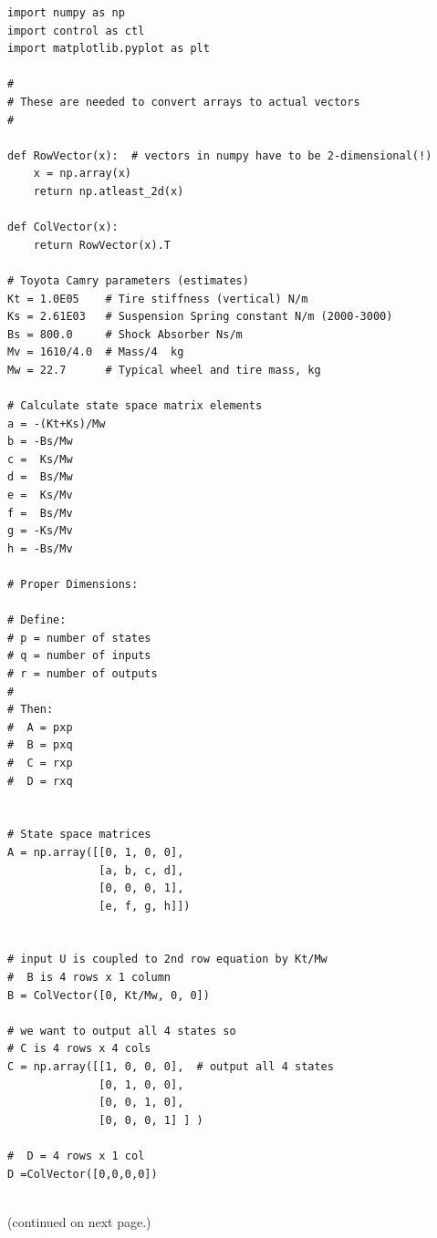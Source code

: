 \begin{listing}
\begin{verbatim}
import numpy as np
import control as ctl
import matplotlib.pyplot as plt

#
# These are needed to convert arrays to actual vectors
#

def RowVector(x):  # vectors in numpy have to be 2-dimensional(!)
    x = np.array(x)
    return np.atleast_2d(x)

def ColVector(x):
    return RowVector(x).T

# Toyota Camry parameters (estimates)
Kt = 1.0E05    # Tire stiffness (vertical) N/m
Ks = 2.61E03   # Suspension Spring constant N/m (2000-3000)
Bs = 800.0     # Shock Absorber Ns/m
Mv = 1610/4.0  # Mass/4  kg
Mw = 22.7      # Typical wheel and tire mass, kg

# Calculate state space matrix elements
a = -(Kt+Ks)/Mw
b = -Bs/Mw
c =  Ks/Mw
d =  Bs/Mw
e =  Ks/Mv
f =  Bs/Mv
g = -Ks/Mv
h = -Bs/Mv

# Proper Dimensions:

# Define:
# p = number of states
# q = number of inputs
# r = number of outputs
#
# Then:
#  A = pxp
#  B = pxq
#  C = rxp
#  D = rxq


# State space matrices
A = np.array([[0, 1, 0, 0],
              [a, b, c, d],
              [0, 0, 0, 1],
              [e, f, g, h]])


# input U is coupled to 2nd row equation by Kt/Mw
#  B is 4 rows x 1 column
B = ColVector([0, Kt/Mw, 0, 0])

# we want to output all 4 states so
# C is 4 rows x 4 cols
C = np.array([[1, 0, 0, 0],  # output all 4 states
              [0, 1, 0, 0],
              [0, 0, 1, 0],
              [0, 0, 0, 1] ] )

#  D = 4 rows x 1 col
D =ColVector([0,0,0,0])


\end{verbatim}
\caption{(continued on next page.)}
\end{listing}


